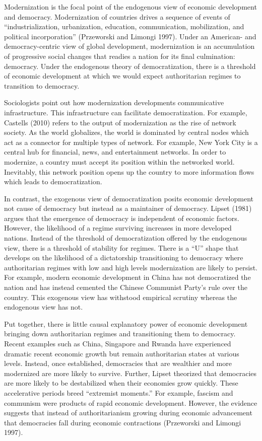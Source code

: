 \documentclass[12pt,]{article}
\begin{document}
Modernization is the focal point of the endogenous view of economic
development and democracy. Modernization of countries drives a sequence
of events of ``industrialization, urbanization, education,
communication, mobilization, and political incorporation'' (Przeworski
and Limongi 1997). Under an American- and democracy-centric view of
global development, modernization is an accumulation of progressive
social changes that readies a nation for its final culmination:
democracy. Under the endogenous theory of democratization, there is a
threshold of economic development at which we would expect authoritarian
regimes to transition to democracy.

Sociologists point out how modernization developments communicative
infrastructure. This infrastructure can facilitate democratization. For
example, Castells (2010) refers to the output of modernization as the
rise of network society. As the world globalizes, the world is dominated
by central nodes which act as a connector for multiple types of network.
For example, New York City is a central hub for financial, news, and
entertainment networks. In order to modernize, a country must accept its
position within the networked world. Inevitably, this network position
opens up the country to more information flows which leads to
democratization.

In contrast, the exogenous view of democratization posits economic
development not cause of democracy but instead as a maintainer of
democracy. Lipset (1981) argues that the emergence of democracy is
independent of economic factors. However, the likelihood of a regime
surviving increases in more developed nations. Instead of the threshold
of democratization offered by the endogenous view, there is a threshold
of stability for regimes. There is a ``U'' shape that develops on the
likelihood of a dictatorship transitioning to democracy where
authoritarian regimes with low and high levels modernization are likely
to persist. For example, modern economic development in China has not
democratized the nation and has instead cemented the Chinese Communist
Party's rule over the country. This exogenous view has withstood
empirical scrutiny whereas the endogenous view has not.

Put together, there is little causal explanatory power of economic
development bringing down authoritarian regimes and transitioning them
to democracy. Recent examples such as China, Singapore and Rwanda have
experienced dramatic recent economic growth but remain authoritarian
states at various levels. Instead, once established, democracies that
are wealthier and more modernized are more likely to survive. Further,
Lipset theorized that democracies are more likely to be destabilized
when their economies grow quickly. These accelerative periods breed
``extremist moments.'' For example, fascism and communism were products
of rapid economic development. However, the evidence suggests that
instead of authoritarianism growing during economic advancement that
democracies fall during economic contractions (Przeworski and Limongi
1997).
\end{document}
